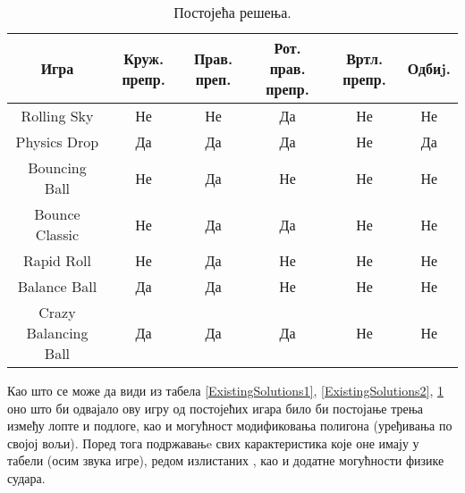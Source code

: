 \begin{table}[H]
\begin{tabular}{|c|c|c|c|c|c|}
\hline
Игра & Круж. препр.& Прав. преп.& Рот. прав. препр.& Вртл. препр.& Одбиj.\\
\hline
Rolling Sky  & Не & Не &  Да&Не&Не\\
Physics Drop  & Да & Да &  Да & Не&Да\\
Bouncing Ball & Не & Да&  Не& Не&Не\\
Bounce Classic & Не & Да &  Да& Не&Не\\
Rapid Roll  & Не & Да&  Не& Не&Не\\
Balance Ball& Да & Да&  Не &Не&Не\\
Crazy Balancing Ball & Да & Да&  Да &Не&Не\\

\hline
\end{tabular}

\caption{Постојећа решења.} \label{ExistingSolutions3}
\end{table}


Као што се може да види из табела \ref{ExistingSolutions1}, \ref{ExistingSolutions2}, \ref{ExistingSolutions3} оно што би одвајало ову игру од постојећих игара било би постојање трења између лопте и подлоге, као и могућност модификовања полигона (уређивања по својој вољи). Поред тога подржавањe свих карактеристика које оне имају у табели (осим звука игре), редом излистаних , као и додатне могућности физике судара.

